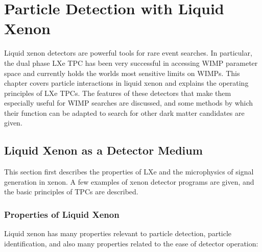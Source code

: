 \chapter{Particle Detection with Liquid Xenon}

\label{ch:LXeTPCs} 

Liquid xenon detectors are powerful tools for rare event searches. In particular, the dual phase \ac{LXe} \ac{TPC} has been very successful in accessing \ac{WIMP} parameter space and currently holds the worlds most sensitive limits on \ac{WIMP}s. This chapter covers particle interactions in liquid xenon and explains the operating principles of \ac{LXe} \ac{TPC}s. The features of these detectors that make them especially useful for \ac{WIMP} searches are discussed, and some methods by which their function can be adapted to search for other dark matter candidates are given.

\section{Liquid Xenon as a Detector Medium}
 This section first describes the properties of \ac{LXe} and the microphysics of signal generation in xenon. A few examples of xenon detector programs are given, and the basic principles of \ac{TPC}s are described.

\subsection{Properties of Liquid Xenon}
Liquid xenon has many properties relevant to particle detection, particle identification, and also many properties related to the ease of detector operation:

